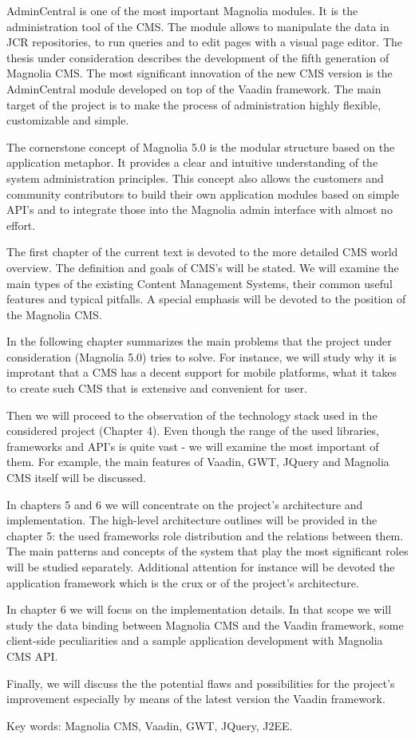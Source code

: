 AdminCentral is one of the most important Magnolia modules. It is the
administration tool of the CMS. The module allows to manipulate the data in JCR
repositories, to run queries and to edit pages with a visual page editor.
The thesis under consideration describes the development of the fifth generation
of Magnolia CMS. The most significant innovation of the new CMS version is the
AdminCentral module developed on top of the Vaadin framework. The main target of
the project is to make the process of administration highly flexible,
customizable and simple.

The cornerstone concept of Magnolia 5.0 is the modular structure based on the
application metaphor. It provides a clear and intuitive understanding of the
system administration principles. This concept also allows the customers and
community contributors to build their own application modules based on simple
API's and to integrate those into the Magnolia admin interface with almost no
effort.

The first chapter of the current text is devoted to the more detailed CMS world
overview. The definition and goals of CMS's will be stated. We will examine the
main types of the existing Content Management Systems, their common useful
features and typical pitfalls. A special emphasis will be devoted to the
position of the Magnolia CMS.

In the following chapter summarizes the main problems that the project under
consideration (Magnolia 5.0) tries to solve. For instance, we will study why it
is improtant that a CMS has a decent support for mobile platforms, what it takes
to create such CMS that is extensive and convenient for user.

Then we will proceed to the observation of the technology stack used in the
considered project (Chapter 4). Even though the range of the used libraries,
frameworks and API's is quite vast - we will examine the most important of them.
For example, the main features of Vaadin, GWT, JQuery and Magnolia CMS itself
will be discussed.

In chapters 5 and 6 we will concentrate on the project's architecture and
implementation. The high-level architecture outlines will be provided in the
chapter 5: the used frameworks role distribution and the relations between them.
The main patterns and concepts of the system that play the most significant
roles will be studied separately. Additional attention for instance will be
devoted the application framework which is the crux or of the project's
architecture.

In chapter 6 we will focus on the implementation details. In that scope we will
study the data binding between Magnolia CMS and the Vaadin framework, some
client-side peculiarities and a sample application development with Magnolia CMS
API.

Finally, we will discuss the the potential flaws and possibilities for the
project's improvement especially by means of the latest version the Vaadin
framework.

Key words: Magnolia CMS, Vaadin, GWT, JQuery, J2EE.
\pagebreak
